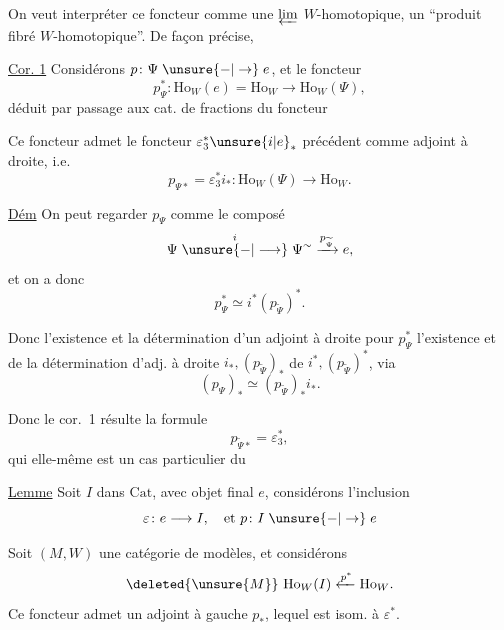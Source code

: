 On veut interpréter ce foncteur comme une $\varprojlim$ $W$-homotopique,   un  ``produit fibré $W$-homotopique''. De façon précise,  \unsure{=|-}

\uline{Cor. 1} Considérons $p\colon\Psi\mathrel{\unsure{-|\to}}e$, et le foncteur
\[
p_\Psi^*\colon\mathrm{Ho}_W(e)=\mathrm{Ho}_W\longrightarrow\mathrm{Ho}_W(\Psi),
\]
déduit par passage aux cat. de fractions du foncteur

Ce foncteur admet  le  foncteur $\varepsilon_3^*\unsure{i|e}_*$ précédent comme adjoint à droite, i.e.
\[
p_{\Psi*}=\varepsilon_3^*i_*\colon\mathrm{Ho}_W(\Psi)\longrightarrow\mathrm{Ho}_W.
\]

\uline{Dém} On peut regarder $p_\Psi$ comme le composé
\[
\Psi\mathrel{\overset{i}{\unsure{-|\longrightarrow}}}\Psi^{\sim}\xrightarrow{p_{\widetilde\Psi}}e,
\]
et on a donc
\[
p_\Psi^*\simeq i^*(p_{\widetilde\Psi})^*.
\]

Donc l'existence et la détermination d'un adjoint à droite pour $p_\Psi^*$  l'existence et de la détermination d'adj. à droite $i_*,(p_{\widetilde\Psi})_*$ de $i^*,(p_{\widetilde\Psi})^*$, via
\[
(p_\Psi)_*\simeq(p_{\widetilde\Psi})_*i_*.
\]

Donc le cor.~1 résulte  la formule
\[
p_{\widetilde\Psi*}=\varepsilon_3^*,
\]
qui  elle-même est un cas particulier du

\uline{Lemme} Soit $I$ dans $\mathrm{Cat}$, avec objet final $e$, considérons l'inclusion
\[
\varepsilon\colon e\longrightarrow I,\quad\text{et }p\colon I\mathrel{\unsure{-|\to}}e
\]

Soit $(M,W)$ une catégorie de modèles, et considérons
\[
\deleted{\unsure{M}}\ \mathrm{Ho}_W(I)\xleftarrow{p^*}\mathrm{Ho}_W .
\]
Ce foncteur admet un adjoint à gauche $p_*$, lequel est isom. à $\varepsilon^*$.

